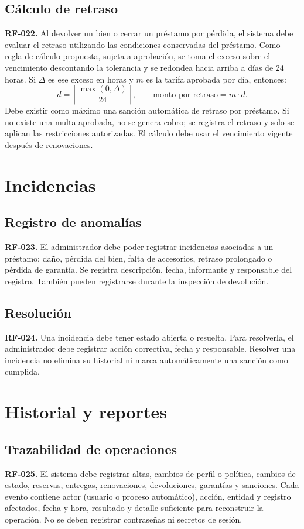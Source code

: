 \subsection{C\'alculo de retraso}
\textbf{RF-022.} Al devolver un bien o cerrar un pr\'estamo por p\'erdida, el sistema debe evaluar el retraso utilizando las condiciones conservadas del pr\'estamo. Como regla de c\'alculo propuesta, sujeta a aprobaci\'on, se toma el exceso sobre el vencimiento descontando la tolerancia y se redondea hacia arriba a d\'ias de 24 horas. Si $\Delta$ es ese exceso en horas y $m$ es la tarifa aprobada por d\'ia, entonces:
\[
    d = \left\lceil \frac{\max(0,\Delta)}{24} \right\rceil,
    \qquad \text{monto por retraso} = m \cdot d.
\]
Debe existir como m\'aximo una sanci\'on autom\'atica de retraso por pr\'estamo. Si no existe una multa aprobada, no se genera cobro; se registra el retraso y solo se aplican las restricciones autorizadas. El c\'alculo debe usar el vencimiento vigente despu\'es de renovaciones.

\section{Incidencias}

\subsection{Registro de anomal\'ias}
\textbf{RF-023.} El administrador debe poder registrar incidencias asociadas a un pr\'estamo: da\~no, p\'erdida del bien, falta de accesorios, retraso prolongado o p\'erdida de garant\'ia. Se registra descripci\'on, fecha, informante y responsable del registro. Tambi\'en pueden registrarse durante la inspecci\'on de devoluci\'on.

\subsection{Resoluci\'on}
\textbf{RF-024.} Una incidencia debe tener estado abierta o resuelta. Para resolverla, el administrador debe registrar acci\'on correctiva, fecha y responsable. Resolver una incidencia no elimina su historial ni marca autom\'aticamente una sanci\'on como cumplida.

\section{Historial y reportes}

\subsection{Trazabilidad de operaciones}
\textbf{RF-025.} El sistema debe registrar altas, cambios de perfil o pol\'itica, cambios de estado, reservas, entregas, renovaciones, devoluciones, garant\'ias y sanciones. Cada evento contiene actor (usuario o proceso autom\'atico), acci\'on, entidad y registro afectados, fecha y hora, resultado y detalle suficiente para reconstruir la operaci\'on. No se deben registrar contrase\~nas ni secretos de sesi\'on.

